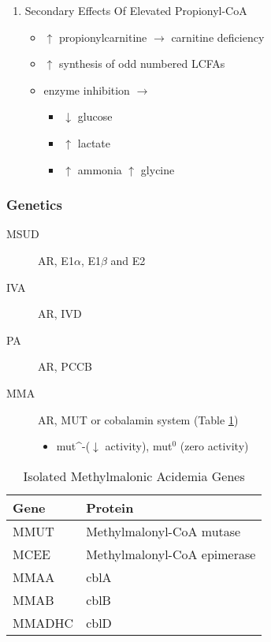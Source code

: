 \documentclass{scrartcl}
\begin{document}
\begin{enumerate}
\item Secondary Effects Of Elevated Propionyl-CoA
\label{sec:org7bf950c}
\begin{itemize}
\item \(\uparrow\) propionylcarnitine \(\to\) carnitine deficiency
\item \(\uparrow\) synthesis of odd numbered LCFAs
\item enzyme inhibition \(\to\)
\begin{itemize}
\item \(\downarrow\) glucose
\item \(\uparrow\) lactate
\item \(\uparrow\) ammonia
\(\uparrow\) glycine
\end{itemize}
\end{itemize}
\end{enumerate}

\subsubsection{Genetics}
\label{sec:orgf99b750}
\begin{description}
\item[{MSUD}] AR, E1\(\alpha\), E1\(\beta\) and E2
\item[{IVA}] AR, IVD
\item[{PA}] AR, PCCB
\item[{MMA}] AR, MUT or cobalamin system (Table \ref{tab:org2bb1b36})
\begin{itemize}
\item mut\^{}-(\(\downarrow\) activity), mut\(^{\text{0}}\) (zero activity)
\end{itemize}
\end{description}

\begin{table}[htbp]
\caption{\label{tab:org2bb1b36}
Isolated Methylmalonic Acidemia Genes}
\centering
\begin{tabular}{ll}
Gene\footnotemark & Protein\\
\hline
MMUT & Methylmalonyl-CoA mutase\\
MCEE & Methylmalonyl-CoA epimerase\\
MMAA & cblA\\
MMAB & cblB\\
MMADHC & cblD\\
\end{tabular}
\end{table}
\end{document}
